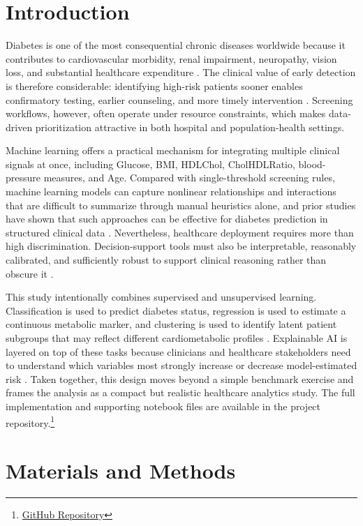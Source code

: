 \documentclass[conference]{IEEEtran}
\begin{document}
\section{Introduction}
Diabetes is one of the most consequential chronic diseases worldwide because it contributes to cardiovascular morbidity, renal impairment, neuropathy, vision loss, and substantial healthcare expenditure \cite{ml_diabetes3}. The clinical value of early detection is therefore considerable: identifying high-risk patients sooner enables confirmatory testing, earlier counseling, and more timely intervention \cite{calibration}. Screening workflows, however, often operate under resource constraints, which makes data-driven prioritization attractive in both hospital and population-health settings.

Machine learning offers a practical mechanism for integrating multiple clinical signals at once, including Glucose, BMI, HDLChol, CholHDLRatio, blood-pressure measures, and Age. Compared with single-threshold screening rules, machine learning models can capture nonlinear relationships and interactions that are difficult to summarize through manual heuristics alone, and prior studies have shown that such approaches can be effective for diabetes prediction in structured clinical data \cite{ml_diabetes1,ml_diabetes2}. Nevertheless, healthcare deployment requires more than high discrimination. Decision-support tools must also be interpretable, reasonably calibrated, and sufficiently robust to support clinical reasoning rather than obscure it \cite{xai_healthcare,xai_ehr}.

This study intentionally combines supervised and unsupervised learning. Classification is used to predict diabetes status, regression is used to estimate a continuous metabolic marker, and clustering is used to identify latent patient subgroups that may reflect different cardiometabolic profiles \cite{cluster_diabetes}. Explainable AI is layered on top of these tasks because clinicians and healthcare stakeholders need to understand which variables most strongly increase or decrease model-estimated risk \cite{xai_healthcare,xai_ehr}. Taken together, this design moves beyond a simple benchmark exercise and frames the analysis as a compact but realistic healthcare analytics study. The full implementation and supporting notebook files are available in the project repository.\footnote{\href{https://github.com/MaryamAli-2020/Explainable-AI-for-Diabetes-Risk-Stratification.git}{GitHub Repository}}

\section{Materials and Methods}
\end{document}
